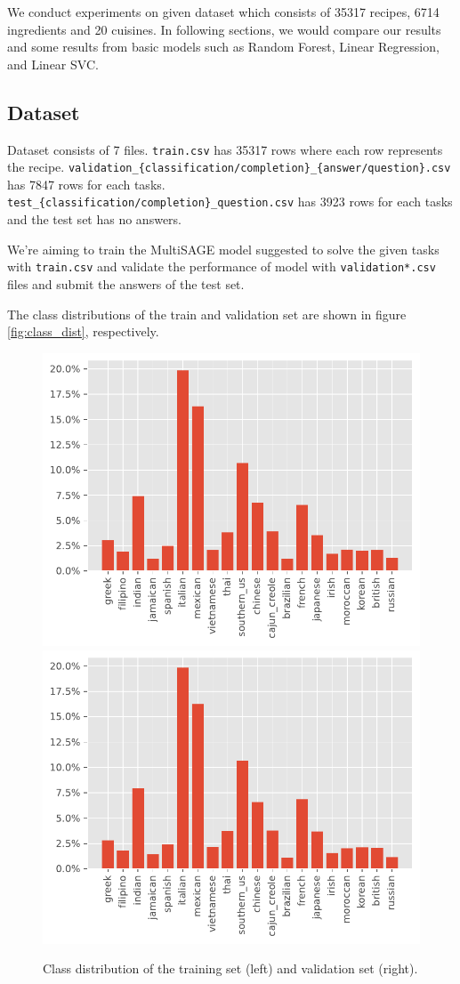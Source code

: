 

 We conduct experiments on given dataset which consists of 35317 recipes, 6714 ingredients and 20 cuisines. In following sections, we would compare our results and some results from basic models such as Random Forest, Linear Regression, and Linear SVC.
 
 \subsection{Dataset}
 Dataset consists of 7 files. \texttt{train.csv} has 35317 rows where each row represents the recipe. \texttt{validation\_\texttt{\{classification/completion\}}\_\texttt{\{answer/question\}}.csv} has 7847 rows for each tasks. \texttt{test\_\texttt{\{classification/completion\}}\_question.csv} has 3923 rows for each tasks and the test set has no answers.  
 
  We're aiming to train the MultiSAGE model suggested to solve the given tasks with \texttt{train.csv} and validate the performance of model with \texttt{validation*.csv} files and submit the answers of the test set.

  The class distributions of the train and validation set are shown in figure \autoref{fig:class_dist}, respectively.

  \begin{figure}
      \includegraphics[width=0.49\linewidth]{FIG/train_class_dist.pdf}
      \includegraphics[width=0.49\linewidth]{FIG/val_class_dist.pdf}
      \caption{\label{fig:class_dist} Class distribution of the training set (left) and validation set (right).}
  \end{figure}

